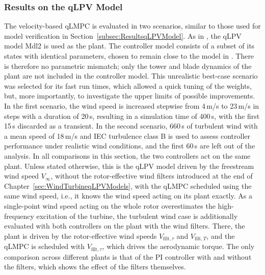 \subsubsection{Results on the qLPV Model}\label{subsubsec:qLMPCMdl2results}

The velocity-based qLMPC is evaluated in two scenarios, similar to those used for model verification in Section~\ref{subsec:ResultsqLPVModel}. As in \cite{dittmer2021velocity}, the qLPV model Mdl2 is used as the plant. The controller model consists of a subset of its states with identical parameters, chosen to remain close to the model in \cite{Bianchi2007}. There is therefore no parametric mismatch; only the tower and blade dynamics of the plant are not included in the controller model. This unrealistic best-case scenario was selected for its fast run times, which allowed a quick tuning of the weights, but, more importantly, to investigate the upper limits of possible improvements. In the first scenario, the wind speed is increased stepwise from 4\,m/s to 23\,m/s in steps with a duration of 20\,s, resulting in a simulation time of 400\,s, with the first 15\,s discarded as a transient. In the second scenario, 660\,s of turbulent wind with a mean speed of 18\,m/s and IEC turbulence class B is used to assess controller performance under realistic wind conditions, and the first 60\,s are left out of the analysis.
%
In all comparisons in this section, the two controllers act on the same plant. Unless stated otherwise, this is the qLPV model driven by the freestream wind speed $V_\infty$, without the rotor-effective wind filters introduced at the end of Chapter~\ref{sec:WindTurbineqLPVModels}, with the qLMPC scheduled using the same wind speed, i.e., it knows the wind speed acting on its plant exactly. As a single-point wind speed acting on the whole rotor overestimates the high-frequency excitation of the turbine, the turbulent wind case is additionally evaluated with both controllers on the plant with the wind filters. There, the plant is driven by the rotor-effective wind speeds $V_{\text{filt},\tau}$ and $V_{\text{filt},T}$, and the qLMPC is scheduled with $V_{\text{filt},\tau}$, which drives the aerodynamic torque. The only comparison across different plants is that of the PI controller with and without the filters, which shows the effect of the filters themselves.

